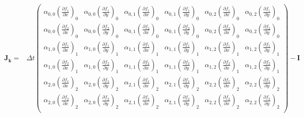 \documentclass[10pt,a4paper]{article}
\newcommand{\bvec}[1]{\mathbf{#1}}
\begin{document}
\begin{align*}
  \bvec{J}_\bvec{k} =& \Delta t\begin{pmatrix}
    \alpha_{0,0} \left( \frac{\partial f_1}{\partial x} \right)_0 & \alpha_{0,0} \left( \frac{\partial f_1}{\partial y} \right)_0 &  \alpha_{0,1} \left( \frac{\partial f_1}{\partial x} \right)_0 & \alpha_{0,1} \left( \frac{\partial f_1}{\partial y} \right)_0 &  \alpha_{0,2} \left( \frac{\partial f_1}{\partial x} \right)_0 & \alpha_{0,2} \left( \frac{\partial f_1}{\partial y} \right)_0 \\
    \alpha_{0,0} \left( \frac{\partial f_2}{\partial x} \right)_0 & \alpha_{0,0} \left( \frac{\partial f_2}{\partial y} \right)_0 &  \alpha_{0,1} \left( \frac{\partial f_2}{\partial x} \right)_0 & \alpha_{0,1} \left( \frac{\partial f_2}{\partial y} \right)_0 &  \alpha_{0,2} \left( \frac{\partial f_2}{\partial x} \right)_0 & \alpha_{0,2} \left( \frac{\partial f_2}{\partial y} \right)_0 \\
    \alpha_{1,0} \left( \frac{\partial f_1}{\partial x} \right)_1 & \alpha_{1,0} \left( \frac{\partial f_1}{\partial y} \right)_1 &  \alpha_{1,1} \left( \frac{\partial f_1}{\partial x} \right)_1 & \alpha_{1,1} \left( \frac{\partial f_1}{\partial y} \right)_1 &  \alpha_{1,2} \left( \frac{\partial f_1}{\partial x} \right)_1 & \alpha_{1,2} \left( \frac{\partial f_1}{\partial y} \right)_1 \\
    \alpha_{1,0} \left( \frac{\partial f_2}{\partial x} \right)_1 & \alpha_{1,0} \left( \frac{\partial f_2}{\partial y} \right)_1 &  \alpha_{1,1} \left( \frac{\partial f_2}{\partial x} \right)_1 & \alpha_{1,1} \left( \frac{\partial f_2}{\partial y} \right)_1 &  \alpha_{1,2} \left( \frac{\partial f_2}{\partial x} \right)_1 & \alpha_{1,2} \left( \frac{\partial f_2}{\partial y} \right)_1 \\
    \alpha_{2,0} \left( \frac{\partial f_1}{\partial x} \right)_2 & \alpha_{2,0} \left( \frac{\partial f_1}{\partial y} \right)_2 &  \alpha_{2,1} \left( \frac{\partial f_1}{\partial x} \right)_2 & \alpha_{2,1} \left( \frac{\partial f_1}{\partial y} \right)_2 &  \alpha_{2,2} \left( \frac{\partial f_1}{\partial x} \right)_2 & \alpha_{2,2} \left( \frac{\partial f_1}{\partial y} \right)_2 \\
    \alpha_{2,0} \left( \frac{\partial f_2}{\partial x} \right)_2 & \alpha_{2,0} \left( \frac{\partial f_2}{\partial y} \right)_2 &  \alpha_{2,1} \left( \frac{\partial f_2}{\partial x} \right)_2 & \alpha_{2,1} \left( \frac{\partial f_2}{\partial y} \right)_2 &  \alpha_{2,2} \left( \frac{\partial f_2}{\partial x} \right)_2 & \alpha_{2,2} \left( \frac{\partial f_2}{\partial y} \right)_2 \\
   \end{pmatrix} - \bvec{I}
\end{align*}
\end{document}
